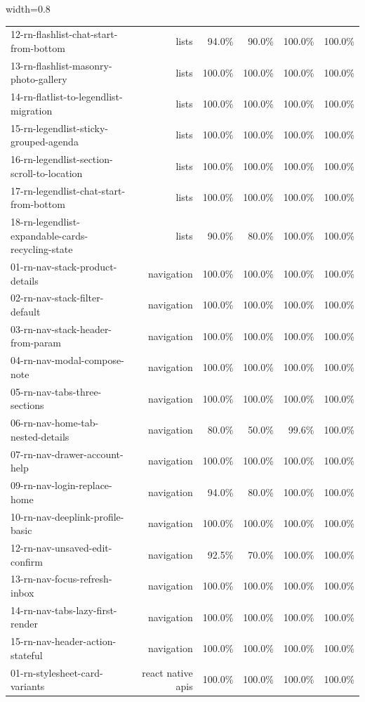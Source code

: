 \begin{table}[htbp]
\begin{adjustbox}{width=0.8\textwidth}
\begin{tabular}{lrrrrr}
12-rn-flashlist-chat-start-from-bottom & lists & 94.0\% & 90.0\% & 100.0\% & 100.0\% \\
13-rn-flashlist-masonry-photo-gallery & lists & 100.0\% & 100.0\% & 100.0\% & 100.0\% \\
14-rn-flatlist-to-legendlist-migration & lists & 100.0\% & 100.0\% & 100.0\% & 100.0\% \\
15-rn-legendlist-sticky-grouped-agenda & lists & 100.0\% & 100.0\% & 100.0\% & 100.0\% \\
16-rn-legendlist-section-scroll-to-location & lists & 100.0\% & 100.0\% & 100.0\% & 100.0\% \\
17-rn-legendlist-chat-start-from-bottom & lists & 100.0\% & 100.0\% & 100.0\% & 100.0\% \\
18-rn-legendlist-expandable-cards-recycling-state & lists & 90.0\% & 80.0\% & 100.0\% & 100.0\% \\
01-rn-nav-stack-product-details & navigation & 100.0\% & 100.0\% & 100.0\% & 100.0\% \\
02-rn-nav-stack-filter-default & navigation & 100.0\% & 100.0\% & 100.0\% & 100.0\% \\
03-rn-nav-stack-header-from-param & navigation & 100.0\% & 100.0\% & 100.0\% & 100.0\% \\
04-rn-nav-modal-compose-note & navigation & 100.0\% & 100.0\% & 100.0\% & 100.0\% \\
05-rn-nav-tabs-three-sections & navigation & 100.0\% & 100.0\% & 100.0\% & 100.0\% \\
06-rn-nav-home-tab-nested-details & navigation & 80.0\% & 50.0\% & 99.6\% & 100.0\% \\
07-rn-nav-drawer-account-help & navigation & 100.0\% & 100.0\% & 100.0\% & 100.0\% \\
09-rn-nav-login-replace-home & navigation & 94.0\% & 80.0\% & 100.0\% & 100.0\% \\
10-rn-nav-deeplink-profile-basic & navigation & 100.0\% & 100.0\% & 100.0\% & 100.0\% \\
12-rn-nav-unsaved-edit-confirm & navigation & 92.5\% & 70.0\% & 100.0\% & 100.0\% \\
13-rn-nav-focus-refresh-inbox & navigation & 100.0\% & 100.0\% & 100.0\% & 100.0\% \\
14-rn-nav-tabs-lazy-first-render & navigation & 100.0\% & 100.0\% & 100.0\% & 100.0\% \\
15-rn-nav-header-action-stateful & navigation & 100.0\% & 100.0\% & 100.0\% & 100.0\% \\
01-rn-stylesheet-card-variants & react native apis & 100.0\% & 100.0\% & 100.0\% & 100.0\% \\

\end{tabular}
\end{adjustbox}
\end{table}
